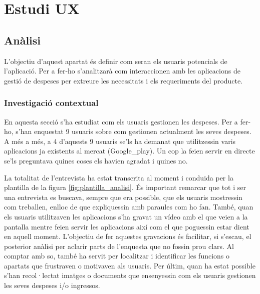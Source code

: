 \chapter{Estudi \ac{UX}}

\section{Anàlisi}
L'objectiu d'aquest apartat és definir com seran els usuaris potencials de l'aplicació. Per a fer-ho s'analitzarà com interaccionen amb les aplicacions de gestió de despeses per extreure les necessitats i els requeriments del producte.

\subsection{Investigació contextual}
En aquesta secció s'ha estudiat com els usuaris gestionen les despeses.  Per a fer-ho, s'han enquestat 9 usuaris sobre com gestionen actualment les seves despeses. A més a més, a 4 d'aquests 9 usuaris se'ls ha demanat que utilitzessin varis aplicacions ja existents al mercat (\gls{Google_play}). Un cop la feien servir en directe se'ls preguntava quines coses els havien agradat i quines no. 

La totalitat de l'entrevista ha estat transcrita al moment i conduida per la plantilla de la figura \ref{fig:plantilla_analisi}. És important remarcar que tot i ser una entrevista es buscava, sempre que era possible, que els usuaris mostressin com treballen, enlloc de que expliquessin amb paraules com ho fan. També, quan els usuaris utilitzaven les aplicacions s'ha gravat un vídeo amb el que veien a la pantalla mentre feien servir les aplicacions així com el que poguessin estar dient en aquell moment. L'objectiu de fer aquestes gravacions és facilitar, si s'escau, el posterior anàlisi per aclarir parts de l'enquesta que no fossin prou clars. Al comptar amb so, també ha servit per localitzar i identificar les funcions o apartats que frustraven o motivaven als usuaris. Per últim, quan ha estat possible s'han recol·lectat imatges o documents que ensenyessin com els usuaris gestionen les seves despeses i/o ingressos. 

